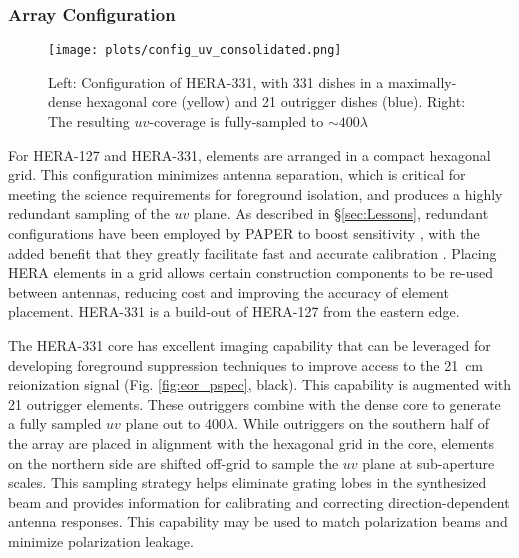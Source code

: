 \documentclass[preprint]{aastex}
\newcommand{\Mycitep}[1]{{\bf \citep{#1}}}
\newcommand{\compress}{\vspace{-0.25in}}
\newcommand{\Caption}[4]{\vspace{#1}\renewcommand{\baselinestretch}{#2}\caption{#4}\vspace{#3}}
\begin{document}
\compress
\subsubsection{Array Configuration}

\begin{figure}[t]
\centering
		\texttt{[image: plots/config\_uv\_consolidated.png]}
\Caption{-0.15in}{0.99}{-0.1in}{\small
Left: Configuration of HERA-331, with 331 dishes in a maximally-dense hexagonal core (yellow) and 21 outrigger dishes (blue).  Right: The resulting $uv$-coverage is fully-sampled to $\sim 400\lambda$ 
}\label{fig:uv_coverage}
\end{figure}

For HERA-127 and HERA-331, elements are arranged in a compact hexagonal grid.
This configuration minimizes antenna separation, which is critical for meeting
the science requirements for foreground isolation, and 
produces a highly redundant sampling of the $uv$ plane.  As described in
\S\ref{sec:Lessons}, redundant configurations have been employed by PAPER to
boost sensitivity \Mycitep{parsons_et_al2012a}, with the added benefit that they
greatly facilitate fast and accurate calibration
\Mycitep{liu_et_al2010,parsons_et_al2013}.  Placing HERA elements in a
grid allows certain construction components to be re-used between antennas,
reducing cost and improving the accuracy of element placement.  HERA-331 
is a build-out of HERA-127 from the eastern edge.

The HERA-331 core has excellent
imaging capability that can be leveraged for developing foreground suppression techniques
to improve access to the 21~cm reionization signal 
(Fig. \ref{fig:eor_pspec}, black).
This capability is augmented with 21 outrigger elements.  These outriggers
combine with the dense core to generate a fully
sampled $uv$ plane out to 400$\lambda$.  While outriggers on the southern half of the array are
placed in alignment with the hexagonal grid in the core, elements on the northern side are
shifted off-grid to sample the $uv$ plane at sub-aperture scales.
This sampling strategy helps eliminate grating lobes in the
synthesized beam and provides information for
calibrating and correcting direction-dependent antenna responses.  This capability may
be used to match polarization beams and minimize
polarization leakage.
\end{document}
